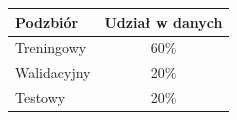 \begin{tabular}{lc}
\toprule
Podzbiór & Udział w danych \\
\midrule
Treningowy & 60\% \\
Walidacyjny & 20\% \\
Testowy & 20\% \\
\bottomrule
\end{tabular}
